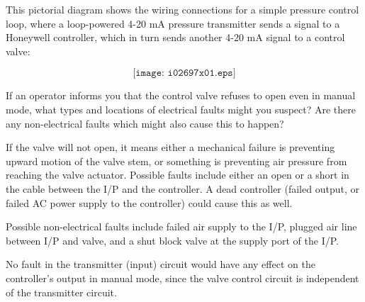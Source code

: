 

This pictorial diagram shows the wiring connections for a simple pressure control loop, where a loop-powered 4-20 mA pressure transmitter sends a signal to a Honeywell controller, which in turn sends another 4-20 mA signal to a control valve:

$$\texttt{[image: i02697x01.eps]}$$

If an operator informs you that the control valve refuses to open even in manual mode, what types and locations of electrical faults might you suspect?  Are there any non-electrical faults which might also cause this to happen?








If the valve will not open, it means either a mechanical failure is preventing upward motion of the valve stem, or something is preventing air pressure from reaching the valve actuator.  Possible faults include either an open or a short in the cable between the I/P and the controller.  A dead controller (failed output, or failed AC power supply to the controller) could cause this as well.
 
\vskip 10pt

Possible non-electrical faults include failed air supply to the I/P, plugged air line between I/P and valve, and a shut block valve at the supply port of the I/P.

\vskip 10pt

No fault in the transmitter (input) circuit would have any effect on the controller's output in manual mode, since the valve control circuit is independent of the transmitter circuit.











